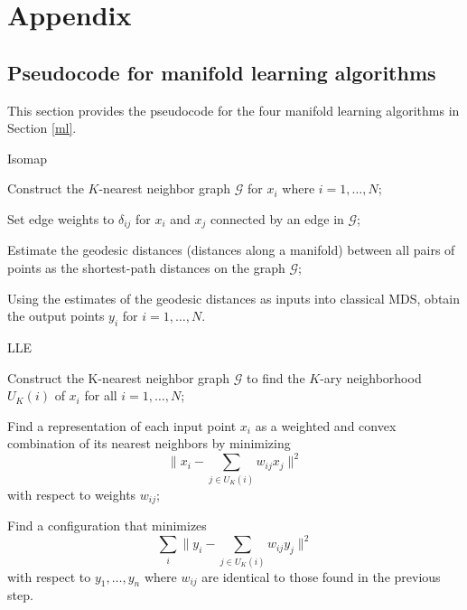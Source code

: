 \clearpage\appendix
\section{Appendix}
\def\thepage{A\arabic{page}}

\subsection{Pseudocode for manifold learning algorithms}
\label{sec:mlalg}
This section provides the pseudocode for the four manifold learning algorithms in Section \ref{ml}.

\begin{algorithm}[!htb]
  \caption{Isomap}
  \label{alg:isomap}
  \DontPrintSemicolon
  \SetAlgoLined
  \BlankLine

  Construct the $K$-nearest neighbor graph $\mathcal{G}$ for $x_i$ where $i=1,\ldots,N$;

  Set edge weights to $\delta_{ij}$ for $x_i$ and $x_j$ connected by an edge in $\mathcal{G}$;

  Estimate the geodesic distances (distances along a manifold) between all pairs of points as the shortest-path distances on the graph $\mathcal{G}$;

  Using the estimates of the geodesic distances as inputs into classical MDS, obtain the output points $y_i$ for $i=1,\ldots,N$.

\end{algorithm}


\begin{algorithm}[!htb]
  \caption{LLE}
  \label{alg:lle}
  \DontPrintSemicolon
  \SetAlgoLined
  \BlankLine

  Construct the K-nearest neighbor graph $\mathcal{G}$ to find the $K$-ary neighborhood $U_K(i)$ of $x_i$ for all $i=1,\ldots,N$;

  Find a representation of each input point $x_i$ as a weighted and convex combination of its nearest neighbors by minimizing
  $$
    \bigg\|x_{i}-\sum_{j \in U_K(i)} w_{i j} x_{j}\bigg\|^{2}
  $$
  with respect to weights $w_{ij}$;

  Find a configuration that minimizes
  $$
    \sum_{i}\bigg\|y_{i}-\sum_{j \in U_K(i)} w_{i j} y_{j}\bigg\|^{2}
  $$
  with respect to $y_{1}, \dots, y_{n}$ where $w_{ij}$ are identical to those found in the previous step.

\end{algorithm}

